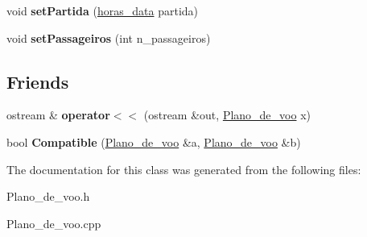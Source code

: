 \begin{DoxyCompactItemize}
\item 
\hypertarget{class_plano__de__voo_a3f1ea1f3c27967e7c5a3c507992b8ac8}{
void {\bfseries setPartida} (\hyperlink{structhoras__data}{horas\_\-data} partida)}
\label{class_plano__de__voo_a3f1ea1f3c27967e7c5a3c507992b8ac8}

\item 
\hypertarget{class_plano__de__voo_af54c6e8391c34ab9ae6f6bd9a7d290f2}{
void {\bfseries setPassageiros} (int n\_\-passageiros)}
\label{class_plano__de__voo_af54c6e8391c34ab9ae6f6bd9a7d290f2}

\end{DoxyCompactItemize}
\subsection*{Friends}
\begin{DoxyCompactItemize}
\item 
\hypertarget{class_plano__de__voo_a009cb99043cb1faddabf40707bb3c2e5}{
ostream \& {\bfseries operator$<$$<$} (ostream \&out, \hyperlink{class_plano__de__voo}{Plano\_\-de\_\-voo} x)}
\label{class_plano__de__voo_a009cb99043cb1faddabf40707bb3c2e5}

\item 
\hypertarget{class_plano__de__voo_a08028398c80665757e9ad6168d248f3f}{
bool {\bfseries Compatible} (\hyperlink{class_plano__de__voo}{Plano\_\-de\_\-voo} \&a, \hyperlink{class_plano__de__voo}{Plano\_\-de\_\-voo} \&b)}
\label{class_plano__de__voo_a08028398c80665757e9ad6168d248f3f}

\end{DoxyCompactItemize}


The documentation for this class was generated from the following files:\begin{DoxyCompactItemize}
\item 
Plano\_\-de\_\-voo.h\item 
Plano\_\-de\_\-voo.cpp\end{DoxyCompactItemize}

